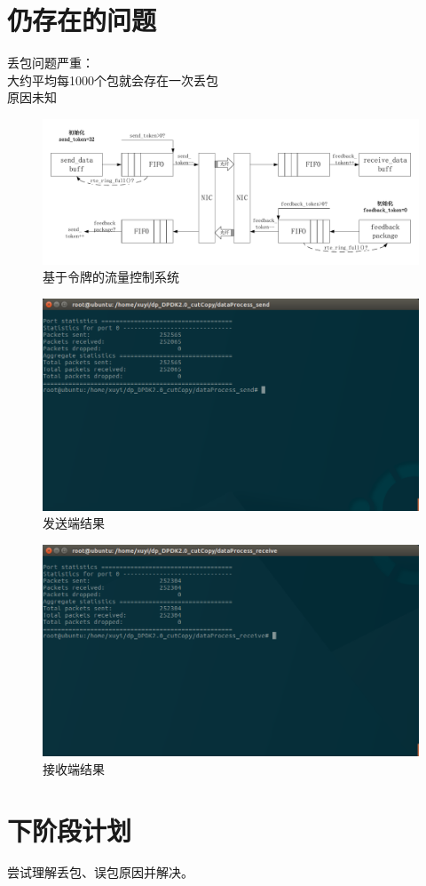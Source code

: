 \documentclass{article}
\begin{document}
\section{仍存在的问题}
丢包问题严重：\\
大约平均每1000个包就会存在一次丢包\\
原因未知
\begin{figure}[H]
	\centering
	\includegraphics[width = \textwidth]{frame_token.pdf}
	\caption{基于令牌的流量控制系统}
\end{figure}
\begin{figure}[H]
	\centering
	\includegraphics[width = .8\textwidth]{result_drop_send.png}
	\caption{发送端结果}
\end{figure}
\begin{figure}[H]
	\centering
	\includegraphics[width = .8\textwidth]{result_drop_receive.png}
	\caption{接收端结果}
\end{figure}



\section{下阶段计划}
尝试理解丢包、误包原因并解决。
\end{document}
